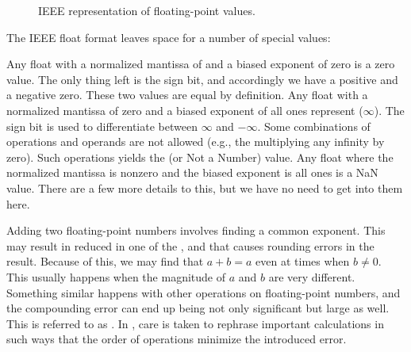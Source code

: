\begin{figure}[tbp]
  
  \caption{IEEE representation of floating-point values.}
  \label{fig:primitives:float:repr}
\end{figure}

The IEEE float format leaves space for a number of special values:
\begin{enumerate}
   Any float with a normalized mantissa of  and a biased exponent of zero is a zero value. The only thing left is the sign bit, and accordingly we have a positive and a negative zero. These two values are equal by definition.
   Any float with a normalized mantissa of zero and a biased exponent of all ones represent  ($\infty$). The sign bit is used to differentiate between $\infty$ and $-\infty$.
   Some combinations of operations and operands are not allowed (e.g., the multiplying any infinity by zero). Such operations yields the  (or Not a Number) value. Any float where the normalized mantissa is nonzero and the biased exponent is all ones is a NaN value. There are a few more details to this, but we have no need to get into them here.
\end{enumerate}

Adding two floating-point numbers involves finding a common exponent. This may result in reduced  in one of the , and that causes rounding errors in the result. Because of this, we may find that $a+b=a$ even at times when $b \neq 0$. This usually happens when the magnitude of $a$ and $b$ are very different. Something similar happens with other operations on floating-point numbers, and the compounding error can end up being not only significant but large as well. This is referred to as . In , care is taken to rephrase important calculations in such ways that the order of operations minimize the introduced error.

